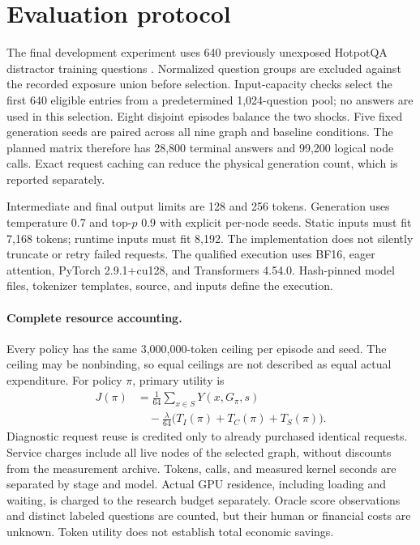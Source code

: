 \section{Evaluation protocol}
\label{sec:protocol}
The final development experiment uses 640 previously unexposed HotpotQA
distractor training questions \citep{hotpot}. Normalized question groups are
excluded against the recorded exposure union before selection. Input-capacity
checks select the first 640 eligible entries from a predetermined 1,024-question
pool; no answers are used in this selection. Eight disjoint episodes balance
the two shocks. Five fixed generation seeds are paired across all nine graph
and baseline conditions. The planned matrix therefore has 28,800 terminal
answers and 99,200 logical node calls. Exact request caching can reduce the
physical generation count, which is reported separately.

Intermediate and final output limits are 128 and 256 tokens. Generation uses
temperature 0.7 and top-$p$ 0.9 with explicit per-node seeds. Static inputs
must fit 7,168 tokens; runtime inputs must fit 8,192. The implementation does
not silently truncate or retry failed requests. The qualified execution uses
BF16, eager attention, PyTorch 2.9.1+cu128, and Transformers 4.54.0. Hash-pinned
model files, tokenizer templates, source, and inputs define the execution.

\paragraph{Complete resource accounting.}
Every policy has the same 3,000,000-token ceiling per episode and seed.
The ceiling may be nonbinding, so equal ceilings are not described as equal
actual expenditure. For policy $\pi$, primary utility is
\begin{equation}
 \begin{aligned}
 J(\pi)&=\frac{1}{64}\sum_{x\in S}Y(x,G_\pi,s)\\
 &\quad-\frac{\lambda}{64}\bigl(T_I(\pi)+T_C(\pi)+T_S(\pi)\bigr).
 \end{aligned}
\end{equation}
Diagnostic request reuse is credited only to already purchased identical
requests. Service charges include all live nodes of the selected graph,
without discounts from the measurement archive. Tokens, calls, and measured
kernel seconds are separated by stage and model. Actual GPU residence,
including loading and waiting, is charged to the research budget separately.
Oracle score observations and distinct labeled questions are counted, but
their human or financial costs are unknown. Token utility does not establish
total economic savings.

